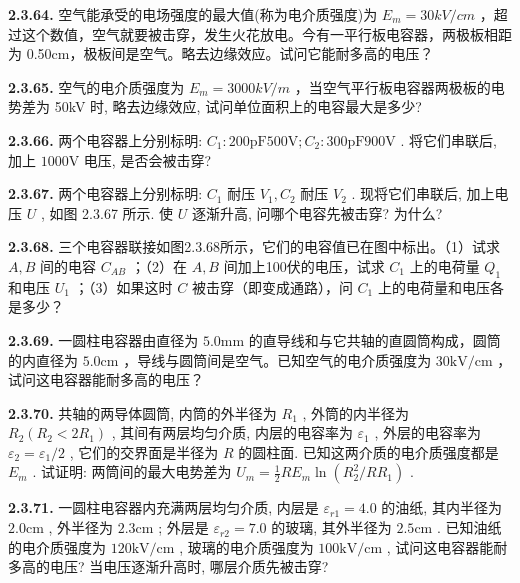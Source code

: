 \vfill
\newpage

\textbf{2.3.64.} 空气能承受的电场强度的最大值(称为电介质强度)为 $E_{m}=30kV/cm$ ，超过这个数值，空气就要被击穿，发生火花放电。今有一平行板电容器，两极板相距为 0.50cm，极板间是空气。略去边缘效应。试问它能耐多高的电压？

\vfill
\newpage

\textbf{2.3.65.} 空气的电介质强度为 $E_{m}=3000kV/m$ ，当空气平行板电容器两极板的电势差为 50kV 时, 略去边缘效应, 试问单位面积上的电容最大是多少?

\vfill
\newpage

\textbf{2.3.66.} 两个电容器上分别标明: $C_1:200\mathrm{pF}500\mathrm{V}; C_2:300\mathrm{pF}900\mathrm{V}$ . 将它们串联后, 加上 $1000\mathrm{V}$ 电压, 是否会被击穿?

\vfill
\newpage

\textbf{2.3.67.} 两个电容器上分别标明: $C_1$ 耐压 $V_1, C_2$ 耐压 $V_2$ . 现将它们串联后, 加上电压 $U$ , 如图 2.3.67 所示. 使 $U$ 逐渐升高, 问哪个电容先被击穿? 为什么?

\begin{center}
\end{center}

\vfill
\newpage

\textbf{2.3.68.} 三个电容器联接如图2.3.68所示，它们的电容值已在图中标出。（1）试求 $A, B$ 间的电容 $C_{AB}$ ；（2）在 $A, B$ 间加上100伏的电压，试求 $C_1$ 上的电荷量 $Q_1$ 和电压 $U_1$ ；（3）如果这时 $C$ 被击穿（即变成通路），问 $C_1$ 上的电荷量和电压各是多少？

\vfill
\newpage

\textbf{2.3.69.} 一圆柱电容器由直径为 $5.0\mathrm{mm}$ 的直导线和与它共轴的直圆筒构成，圆筒的内直径为 $5.0\mathrm{cm}$ ，导线与圆筒间是空气。已知空气的电介质强度为 $30\mathrm{kV/cm}$ ，试问这电容器能耐多高的电压？

\vfill
\newpage

\textbf{2.3.70.} 共轴的两导体圆筒, 内筒的外半径为 $R_{1}$ , 外筒的内半径为 $R_{2}(R_{2}<2R_{1})$ , 其间有两层均匀介质, 内层的电容率为 $\varepsilon_{1}$ , 外层的电容率为 $\varepsilon_{2}=\varepsilon_{1}/2$ , 它们的交界面是半径为 $R$ 的圆柱面. 已知这两介质的电介质强度都是 $E_{m}$ . 试证明: 两筒间的最大电势差为 $\displaystyle U_{m}=\frac{1}{2}RE_{m}\ln(R_{2}^{2}/RR_{1})$ .

\vfill
\newpage

\textbf{2.3.71.} 一圆柱电容器内充满两层均匀介质, 内层是 $\varepsilon_{r1} = 4.0$ 的油纸, 其内半径为 $2.0\mathrm{cm}$ , 外半径为 $2.3\mathrm{cm}$ ; 外层是 $\varepsilon_{r2} = 7.0$ 的玻璃, 其外半径为 $2.5\mathrm{cm}$ . 已知油纸的电介质强度为 $120\mathrm{kV/cm}$ , 玻璃的电介质强度为 $100\mathrm{kV/cm}$ , 试问这电容器能耐多高的电压? 当电压逐渐升高时, 哪层介质先被击穿?

